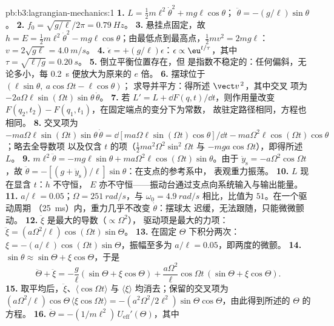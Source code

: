 \begin{solution}{pb:b3:lagrangian-mechanics:1}
\textbf{1.} $L = \tfrac12 m\ell^2\dot\theta^2 + mg\ell\cos\theta$；
$\ddot\theta = -(g/\ell)\sin\theta$。
\textbf{2.} $f_0 = \sqrt{g/\ell}/2\pi = \qty{0.79}{Hz}$。
\textbf{3.} 悬挂点固定，故 $h = E = \tfrac12
m\ell^2\dot\theta^2 - mg\ell\cos\theta$；由最低点到最高点，$\tfrac12
mv^2 = 2mg\ell$：$v = 2\sqrt{g\ell} = \qty{4.0}{m/s}$。
\textbf{4.} $\ddot\epsilon = +(g/\ell)\epsilon$：$\epsilon \propto
\eu^{t/\tau}$，其中 $\tau = \sqrt{\ell/g} = \qty{0.20}{s}$。
\textbf{5.} 倒立平衡位置存在，但
是指数不稳定的：任何偏斜，无论多小，每
\qty{0.2}{s} 便放大为原来的 $e$ 倍。
\textbf{6.} 摆球位于 $(\ell\sin\theta,\ a\cos\Omega t - \ell\cos\theta)$；
求导并平方：得所述 $\vect v^{\,2}$，其中交叉
项为 $-2a\Omega\ell\sin(\Omega t)\sin\theta\,\dot\theta$。
\textbf{7.} 若 $L' = L + \dd F(q,t)/\dd t$，则作用量改变
$F(q_2, t_2) - F(q_1, t_1)$，在固定端点的变分下为常数，
故驻定路径相同，方程也相同。
\textbf{8.} 交叉项为 $-ma\Omega\ell\sin(\Omega t)\sin\theta\,
\dot\theta = \dd[ma\Omega\ell\sin(\Omega t)\cos\theta]/\dd t -
ma\Omega^2\ell\cos(\Omega t)\cos\theta$；略去全导数项
以及仅含 $t$ 的项（$\tfrac12 ma^2\Omega^2\sin^2\Omega t$ 与
$-mga\cos\Omega t$），即得所述 $L$。
\textbf{9.} $m\ell^2\ddot\theta = -mg\ell\sin\theta +
ma\Omega^2\ell\cos(\Omega t)\sin\theta$。由于 $\ddot y_{\text{s}} =
-a\Omega^2\cos\Omega t$，故 $\ddot\theta =
-[(g + \ddot y_{\text{s}})/\ell]\sin\theta$：在支点的参考系中，
表观重力振荡。
\textbf{10.} $L$ 现在显含 $t$：$h$ 不守恒，
$E$ 亦不守恒——振动台通过支点向系统输入与输出能量。
\textbf{11.} $a/\ell = 0.05$；$\Omega = \qty{251}{rad/s}$，与
$\omega_0 = \qty{4.9}{rad/s}$ 相比，比值为 $51$。在一个驱动周期
（\qty{25}{ms}）内，重力几乎不改变 $\dot\theta$：摆球太
迟缓，无法跟随，只能微微颤动。
\textbf{12.} $\ddot\xi$ 是最大的导数（$\propto\Omega^2$），
驱动项是最大的力项：$\ddot\xi =
(a\Omega^2/\ell)\cos(\Omega t)\sin\Theta$。
\textbf{13.} 在固定 $\Theta$ 下积分两次：$\xi =
-(a/\ell)\cos(\Omega t)\sin\Theta$，振幅至多为 $a/\ell =
0.05$，即两度的微颤。
\textbf{14.} $\sin\theta \approx \sin\Theta + \xi\cos\Theta$，于是
\[
\ddot\Theta + \ddot\xi = -\frac{g}{\ell}(\sin\Theta + \xi\cos\Theta)
 + \frac{a\Omega^2}{\ell}\cos\Omega t\,(\sin\Theta + \xi\cos\Theta) .
\]
\textbf{15.} 取平均后，$\ddot\xi$、$\langle\cos\Omega t\rangle$
与 $\langle\xi\rangle$ 均消去；保留的交叉项为
$(a\Omega^2/\ell)\cos\Theta\,\langle\xi\cos\Omega t\rangle =
-(a^2\Omega^2/2\ell^2)\sin\Theta\cos\Theta$，由此得到所述的
$\Theta$ 的方程。
\textbf{16.} $\ddot\Theta = -(1/m\ell^2)\,U_{\text{eff}}'(\Theta)$，其中

\end{solution}
